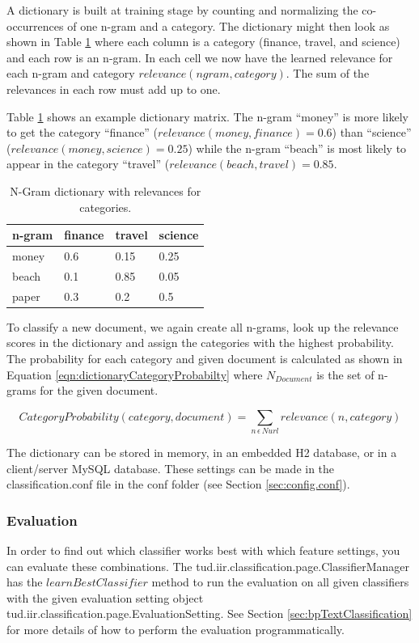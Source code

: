 \documentclass[a4paper,twoside]{book}      %
\begin{document}
A dictionary is built at training stage by counting and normalizing the co-occurrences of one n-gram and a category. The dictionary might then look as shown in Table \ref{tab:dictionary} where each column is a category (finance, travel, and science) and each row is an n-gram. In each cell we now have the learned relevance for each n-gram and category $relevance(ngram,category)$. The sum of the relevances in each row must add up to one.

Table \ref{tab:dictionary} shows an example dictionary matrix. The n-gram ``money'' is more likely to get the category ``finance'' ($relevance(money,finance) = 0.6$) than ``science'' ($relevance(money,science) = 0.25$) while the n-gram ``beach'' is most likely to appear in the category ``travel'' ($relevance(beach,travel) = 0.85$.

\begin{table}[ht]
\centering
\begin{tabular}{|l|l|l|l|}
\hline
n-gram   & finance & travel & science \\
\hline
money	   & 0.6	&	0.15	&	0.25	\\
\hline
beach	& 0.1	&	0.85	&	0.05	\\
\hline
paper	   & 0.3 &	0.2	&	0.5	\\
\hline
\end{tabular} 
\caption{N-Gram dictionary with relevances for categories.}
\label{tab:dictionary}
\end{table}

To classify a new document, we again create all n-grams, look up the relevance scores in the dictionary and assign the categories with the highest probability. The probability for each category and given document is calculated as shown in Equation \ref{eqn:dictionaryCategoryProbabilty} where $N_{Document}$ is the set of n-grams for the given document.

\begin{equation}
\label{eqn:dictionaryCategoryProbabilty}
\mbox{$CategoryProbability(category,document)$} = \sum_{n\,\epsilon\, Nurl} \mbox{$relevance(n,category)$}
\end{equation}

The dictionary can be stored in memory, in an embedded H2 database, or in a client/server MySQL database. These settings can be made in the classification.conf file in the conf folder (see Section \ref{sec:config.conf}).


\subsubsection{Evaluation}
In order to find out which classifier works best with which feature settings, you can evaluate these combinations. The tud.iir.classification.page.ClassifierManager has the $learnBestClassifier$ method to run the evaluation on all given classifiers with the given evaluation setting object tud.iir.classification.page.EvaluationSetting. See Section \ref{sec:bpTextClassification} for more details of how to perform the evaluation programmatically.
\end{document}

